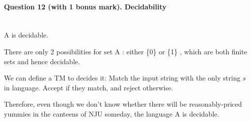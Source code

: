 \documentclass[12pt]{article}
\begin{document}
    \paragraph{Question 12 (with 1 bonus mark). Decidability}~{}
    \\

    A is decidable. \par
    There are only 2 possibilities for set  A  : either  \{0\}  or  \{1\} , which are both finite sets and hence decidable.\par
    We can define a TM to decides it:
    Match the input string with the only string  $s$ in language. Accept if they match, and reject otherwise.\par
    Therefore, even though we don't know whether there will be reasonably-priced yummies in the canteens of NJU someday, the language  A  is decidable.
\end{document}

